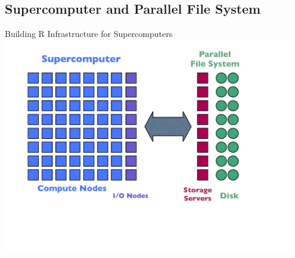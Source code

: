 \subsection{Supercomputer and Parallel File System}
\makesubcontentsslidessec

\begin{frame}
  \begin{block}{Building R Infrastructure for Supercomputers}
    \includegraphics[width=0.95\textwidth]{../common/pics/hardware/SupercomputerFileSystem.pdf}
  \end{block}
\end{frame}